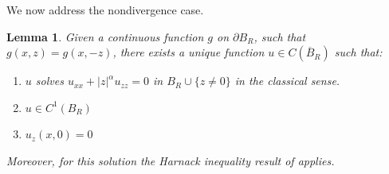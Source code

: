 \documentclass[letterpaper]{article}
\newtheorem{lemma}[thm]{Lemma}
\numberwithin{equation}{section}
\newcommand{\abs}[1]{\left\vert#1\right\vert}
\newcommand{\bdary} {\partial}
\newcommand{\partxx}[1] {#1_{xx}}
\newcommand{\partz}[1] {#1_z}
\newcommand{\partzz}[1] {#1_{zz}}
\begin{document}
We now address the nondivergence case.

\begin{lemma} \label{lem:guti}
Given a continuous function $g$ on $\bdary B_R$, such that $g(x,z) = g(x,-z)$, there exists a unique function $u \in C(\overline B_R)$ such that:
\begin{enumerate}
\item[i.] $u$ solves $\partxx u + \abs{z}^\alpha \partzz u = 0$ in $B_R \cup \{z \neq 0\}$ in the classical sense.
\item[ii.] $u \in C^1(B_R)$
\item[iii.] $\partz u(x,0) = 0$
\end{enumerate}
Moreover, for this solution the Harnack inequality result of \cite{CG} applies.
\end{lemma}
\end{document}
